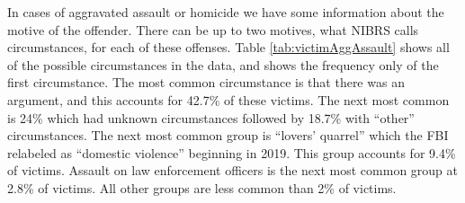 \documentclass[
]{krantz}
\begin{document}
In cases of aggravated assault or homicide we have some
information about the motive of the offender. There can be
up to two motives, what NIBRS calls circumstances, for each
of these offenses. Table \ref{tab:victimAggAssault} shows
all of the possible circumstances in the data, and shows the
frequency only of the first circumstance. The most common
circumstance is that there was an argument, and this
accounts for 42.7\% of these victims. The next most common
is 24\% which had unknown circumstances followed by 18.7\%
with ``other'' circumstances. The next most common group is
``lovers' quarrel'' which the FBI relabeled as ``domestic
violence'' beginning in 2019. This group accounts for 9.4\%
of victims. Assault on law enforcement officers is the next
most common group at 2.8\% of victims. All other groups are
less common than 2\% of victims.
\end{document}
